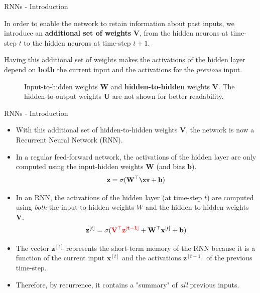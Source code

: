 \begin{frame} {RNNs - Introduction}
  \begin{itemize}
    \item \small{In order to enable the network to retain information about past inputs, we introduce an \textbf{additional set of weights} $\mathbf{V}$, from the hidden neurons at time-step $t$ to the hidden neurons at time-step $t+1$.
    \item Having this additional set of weights makes the activations of the hidden layer depend on \textbf{both} the current input and the activations for the \textit{previous} input.}
  \end{itemize}
  \begin{figure}
      \centering
      \caption{\footnotesize Input-to-hidden weights $\mathbf{W}$ and \textbf{hidden-to-hidden} weights $\mathbf{V}$. The hidden-to-output weights $\mathbf{U}$ are not shown for better readability.}
  \end{figure}
\end{frame}

\begin{frame} {RNNs - Introduction}
  \begin{itemize}
    \item With this additional set of hidden-to-hidden weights $\mathbf{V}$, the network is now a Recurrent Neural Network (RNN).
    \item In a regular feed-forward network, the activations of the hidden layer are only computed using the input-hidden weights $\mathbf{W}$ (and bias $\mathbf{b}$).
    $$\mathbf{z}= \sigma(\mathbf{W}^\top \xv + \mathbf{b})$$
    \item In an RNN, the activations of the hidden layer (at time-step $t$) are computed using \textit{both} the input-to-hidden weights $W$ and the hidden-to-hidden weights $\mathbf{V}$.
    $$\mathbf{z}^{[t]} = \sigma(\mathbf{\textcolor{red}{\mathbf{V}^\top\mathbf{z}^{[t-1]}}} + \mathbf{W}^\top \mathbf{x}^{[t]} + \mathbf{b})$$
    \item The vector $\mathbf{z}^{[t]}$ represents the short-term memory of the RNN because it is a function of the current input $\mathbf{x}^{[t]}$ and the activations $\mathbf{z}^{[t-1]}$ of the previous time-step.
    \item Therefore, by recurrence, it contains a "summary" of \textit{all} previous inputs. 
  \end{itemize}
\end{frame}

